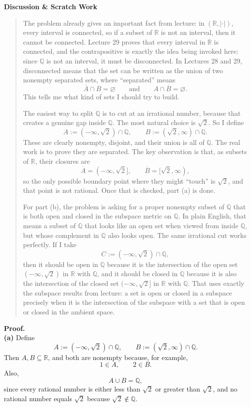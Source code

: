 \documentclass[12pt]{article}
\newenvironment{scratch}{%
  \par\smallskip
  \noindent\textbf{Discussion \& Scratch Work}\begin{quote}\small
}{%
  \end{quote}\smallskip
}
\begin{document}
\begin{scratch}
The problem already gives an important fact from lecture: in $(\mathbb{R},|\cdot|)$, every interval is connected, so if a subset of $\mathbb{R}$ is not an interval, then it cannot be connected. Lecture 29 proves that every interval in $\mathbb{R}$ is connected, and the contrapositive is exactly the idea being invoked here: since $\mathbb{Q}$ is not an interval, it must be disconnected. In Lectures 28 and 29, disconnected means that the set can be written as the union of two nonempty separated sets, where ``separated'' means
\[
\overline{A}\cap B=\varnothing
\qquad\text{and}\qquad
A\cap\overline{B}=\varnothing.
\]
This tells me what kind of sets I should try to build.

The easiest way to split $\mathbb{Q}$ is to cut at an irrational number, because that creates a genuine gap inside $\mathbb{Q}$. The most natural choice is $\sqrt{2}$. So I define
\[
A:=(-\infty,\sqrt{2})\cap\mathbb{Q},
\qquad
B:=(\sqrt{2},\infty)\cap\mathbb{Q}.
\]
These are clearly nonempty, disjoint, and their union is all of $\mathbb{Q}$. The real work is to prove they are separated. The key observation is that, as subsets of $\mathbb{R}$, their closures are
\[
\overline{A}=(-\infty,\sqrt{2}],
\qquad
\overline{B}=[\sqrt{2},\infty),
\]
so the only possible boundary point where they might ``touch'' is $\sqrt{2}$, and that point is not rational. Once that is checked, part (a) is done.

For part (b), the problem is asking for a proper nonempty subset of $\mathbb{Q}$ that is both open and closed in the subspace metric on $\mathbb{Q}$. In plain English, that means a subset of $\mathbb{Q}$ that looks like an open set when viewed from inside $\mathbb{Q}$, but whose complement in $\mathbb{Q}$ also looks open. The same irrational cut works perfectly. If I take
\[
C:=(-\infty,\sqrt{2})\cap\mathbb{Q},
\]
then it should be open in $\mathbb{Q}$ because it is the intersection of the open set $(-\infty,\sqrt{2})$ in $\mathbb{R}$ with $\mathbb{Q}$, and it should be closed in $\mathbb{Q}$ because it is also the intersection of the closed set $(-\infty,\sqrt{2}]$ in $\mathbb{R}$ with $\mathbb{Q}$. That uses exactly the subspace results from lecture: a set is open or closed in a subspace precisely when it is the intersection of the subspace with a set that is open or closed in the ambient space.
\end{scratch}

\textbf{Proof.}\\
\textbf{(a)} Define
\[
A:=(-\infty,\sqrt{2})\cap\mathbb{Q},
\qquad
B:=(\sqrt{2},\infty)\cap\mathbb{Q}.
\]
Then $A,B\subseteq\mathbb{R}$, and both are nonempty because, for example,
\[
1\in A,
\qquad
2\in B.
\]
Also,
\[
A\cup B=\mathbb{Q},
\]
since every rational number is either less than $\sqrt{2}$ or greater than $\sqrt{2}$, and no rational number equals $\sqrt{2}$ because $\sqrt{2}\notin\mathbb{Q}$.
\end{document}
